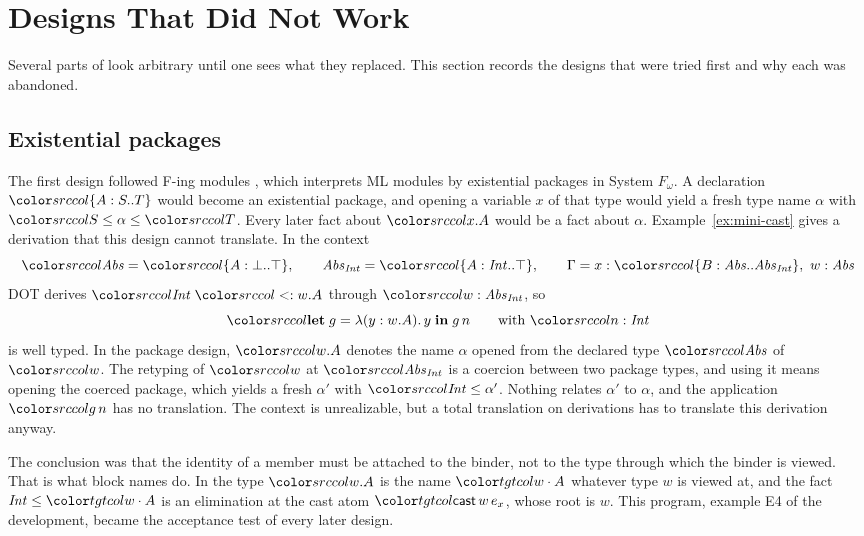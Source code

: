 \mathplain
\section{Designs That Did Not Work}\label{sec:history}

Several parts of \FCdot look arbitrary until one sees what they replaced. This section records the designs that were tried first and why each was abandoned.

\subsection{Existential packages}\label{sec:counterexample}

The first design followed F-ing modules \cite{rossberg2014fing}, which interprets ML modules by existential packages in System $F_\omega$. A declaration $\dtyp{A}{S}{T}$ would become an existential package, and opening a variable $x$ of that type would yield a fresh type name $\alpha$ with $\src{S} \le \alpha \le \src{T}$. Every later fact about $\dsel{x}{A}$ would be a fact about $\alpha$. Example~\ref{ex:mini-cast} gives a derivation that this design cannot translate. In the context
\[
\src{\mathit{Abs} = \dtyp{A}{\bot}{\top}, \qquad \mathit{Abs}_{\mathit{Int}} = \dtyp{A}{\mathit{Int}}{\top}, \qquad \Gamma = x : \dtyp{B}{\mathit{Abs}}{\mathit{Abs}_{\mathit{Int}}},\ w : \mathit{Abs}}
\]
DOT derives $\src{\mathit{Int} \sub w.A}$ through $\src{w : \mathit{Abs}_{\mathit{Int}}}$, so
\[
\src{\klet g = \lambda(y : w.A).\,y \kin g\,n} \qquad \text{with } \src{n : \mathit{Int}}
\]
is well typed. In the package design, $\src{w.A}$ denotes the name $\alpha$ opened from the declared type $\src{\mathit{Abs}}$ of $\src{w}$. The retyping of $\src{w}$ at $\src{\mathit{Abs}_{\mathit{Int}}}$ is a coercion between two package types, and using it means opening the coerced package, which yields a fresh $\alpha'$ with $\src{\mathit{Int}} \le \alpha'$. Nothing relates $\alpha'$ to $\alpha$, and the application $\src{g\,n}$ has no translation. The context is unrealizable, but a total translation on derivations has to translate this derivation anyway.

The conclusion was that the identity of a member must be attached to the binder, not to the type through which the binder is viewed. That is what block names do. In \FCdot the type $\src{w.A}$ is the name $\sel{w}{A}$ whatever type $w$ is viewed at, and the fact $\mathit{Int} \le \sel{w}{A}$ is an elimination at the cast atom $\ev{cast}\,w\,e_x$, whose root is $w$. This program, example E4 of the development, became the acceptance test of every later design.

